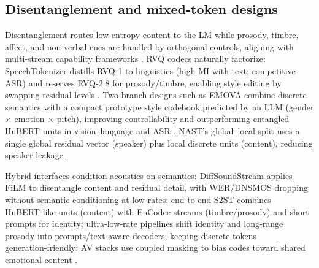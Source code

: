 \subsection{Disentanglement and mixed-token designs} \label{subsec:Disentanglement and mixed-token designs}
Disentanglement routes low‑entropy content to the LM while prosody, timbre, affect, and non‑verbal cues are handled by orthogonal controls, aligning with multi‑stream capability frameworks \cite{wang2025bossbeyondsemanticspeech,guo2025recentadvancesdiscretespeechtokensreview}. RVQ codecs naturally factorize: SpeechTokenizer distills RVQ‑1 to linguistics (high MI with text; competitive ASR) and reserves RVQ‑2:8 for prosody/timbre, enabling style editing by swapping residual levels \cite{zhang2024speechtokenizerunifiedspeechtokenizerlar}. Two‑branch designs such as EMOVA combine discrete semantics with a compact prototype style codebook predicted by an LLM (gender × emotion × pitch), improving controllability and outperforming entangled HuBERT units in vision–language and ASR \cite{chen2025emovaempoweringlanguagemodelsseehearspea}. NAST’s global–local split uses a single global residual vector (speaker) plus local discrete units (content), reducing speaker leakage \cite{messica2024nastnoiseawarespeechtokenizationlanguage}.

Hybrid interfaces condition acoustics on semantics: DiffSoundStream applies FiLM to disentangle content and residual detail, with WER/DNSMOS dropping without semantic conditioning at low rates; end‑to‑end S2ST combines HuBERT‑like units (content) with EnCodec streams (timbre/prosody) and short prompts for identity; ultra‑low‑rate pipelines shift identity and long‑range prosody into prompts/text‑aware decoders, keeping discrete tokens generation‑friendly; AV stacks use coupled masking to bias codes toward shared emotional content \cite{yang2025diffsoundstreamefficientspeechtokenizati,peng2024mslms2stmultitaskspeechlanguagemodeltext,wang2025tadicodectextawarediffusionspeechtokeniz,sadok2025vectorquantizedmaskedautoencoderaudiovis}.

